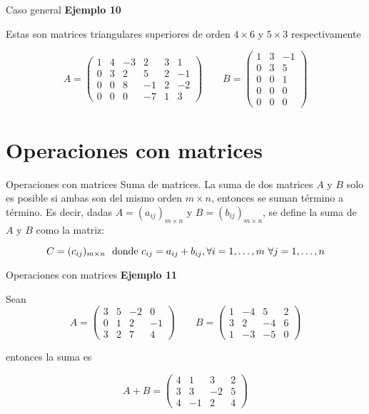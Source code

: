 \documentclass[
  ignorenonframetext,
]{beamer}
\begin{document}
\begin{frame}{Caso general}
\protect\hypertarget{caso-general-2}{}
\textbf{Ejemplo 10}

Estas son matrices triangulares superiores de orden \(4\times 6\) y
\(5\times 3\) respectivamente

\[A = \begin{pmatrix}1&4&-3&2&3&1\\0&3&2&5&2&-1\\0&0&8&-1&2&-2\\0&0&0&-7&1&3\end{pmatrix}\qquad B = \begin{pmatrix}1&3&-1\\0&3&5\\0&0&1\\0&0&0\\0&0&0\end{pmatrix}\]
\end{frame}

\hypertarget{operaciones-con-matrices}{%
\section{Operaciones con matrices}\label{operaciones-con-matrices}}

\begin{frame}{Operaciones con matrices}
\protect\hypertarget{operaciones-con-matrices-1}{}
Suma de matrices. La suma de dos matrices \(A\) y \(B\) solo es posible
si ambas son del mismo orden \(m\times n\), entonces se suman término a
término. Es decir, dadas \(A=(a_{ij})_{m\times n}\) y
\(B=(b_{ij})_{m\times n}\), se define la suma de \(A\) y \(B\) como la
matriz:

\[C = (c_{ij})_{m\times n}\ \text{ donde}\  c_{ij}=a_{ij}+b_{ij},\\ \forall i=1,\dots,m\ \forall j=1,\dots,n\]
\end{frame}

\begin{frame}{Operaciones con matrices}
\protect\hypertarget{operaciones-con-matrices-2}{}
\textbf{Ejemplo 11}

Sean
\[A = \begin{pmatrix}3&5&-2&0\\0&1&2&-1\\3&2&7&4\end{pmatrix}\qquad B=\begin{pmatrix}1&-4&5&2\\3&2&-4&6\\1&-3&-5&0\end{pmatrix}\]

entonces la suma es

\[A+B = \begin{pmatrix}4&1&3&2\\3&3&-2&5\\4&-1&2&4\end{pmatrix}\]
\end{frame}
\end{document}
